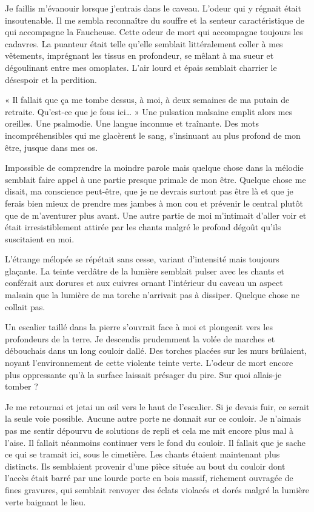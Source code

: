 Je faillis m'évanouir lorsque j'entrais dans le caveau. L'odeur qui y régnait était insoutenable. Il me sembla 
reconnaître du souffre et la senteur caractéristique de qui accompagne la Faucheuse. Cette odeur de mort qui accompagne 
toujours les cadavres. La puanteur était telle qu'elle semblait littéralement coller à mes vêtements, imprégnant les 
tissus en profondeur, se mêlant à ma sueur et dégoulinant entre mes omoplates. L'air lourd et épais semblait charrier 
le désespoir et la perdition.

« Il fallait que ça me tombe dessus, à moi, à deux semaines de ma putain de retraite. Qu'est-ce que je fous ici… » Une 
pulsation malsaine emplit alors mes oreilles. Une psalmodie. Une langue inconnue et traînante. Des mots incompréhensibles 
qui me glacèrent le sang, s'insinuant au plus profond de mon être, jusque dans mes os.

Impossible de comprendre la moindre parole mais quelque chose dans la mélodie semblait faire appel à une partie presque 
primale de mon être. Quelque chose me disait, ma conscience peut-être, que je ne devrais surtout pas être là et que 
je ferais bien mieux de prendre mes jambes à mon cou et prévenir le central plutôt que de m'aventurer plus avant. Une 
autre partie de moi m'intimait d'aller voir et était irresistiblement attirée par les chants malgré le profond 
dégoût qu'ils suscitaient en moi.

L'étrange mélopée se répétait sans cesse, variant d'intensité mais toujours glaçante. La teinte verdâtre de la 
lumière semblait pulser avec les chants et conférait aux dorures et aux cuivres ornant l'intérieur du caveau un aspect 
malsain que la lumière de ma torche n'arrivait pas à dissiper. Quelque chose ne collait pas. 

Un escalier taillé dans la pierre s'ouvrait face à moi et plongeait vers les profondeurs de la terre. Je descendis 
prudemment la volée de marches et débouchais dans un long couloir dallé. Des torches placées sur les murs brûlaient, 
noyant l'environnement de cette violente teinte verte. L'odeur de mort encore plus oppressante qu'à la surface laissait 
présager du pire. Sur quoi allais-je tomber ?

Je me retournai et jetai un œil vers le haut de l'escalier. Si je devais fuir, ce serait la seule voie possible. Aucune 
autre porte ne donnait sur ce couloir. Je n'aimais pas me sentir dépourvu de solutions de repli et cela me mit encore 
plus mal à l'aise. Il fallait néanmoins continuer vers le fond du couloir. Il fallait que je sache ce qui se tramait ici, 
sous le cimetière. Les chants étaient maintenant plus distincts. Ils semblaient provenir d'une pièce située au bout du 
couloir dont l'accès était barré par une lourde porte en bois massif, richement ouvragée de fines gravures, qui semblait 
renvoyer des éclats violacés et dorés malgré la lumière verte baignant le lieu.

